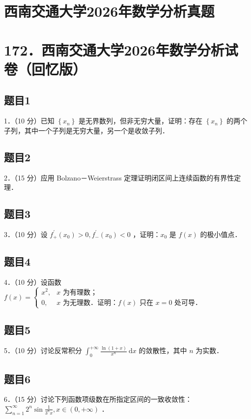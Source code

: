 \documentclass{article}
\begin{document}
\section*{西南交通大学2026年数学分析真题}
\section*{172．西南交通大学2026年数学分析试卷（回忆版）}

\subsection{题目1}
1．（10 分）已知 \(\left\{x_{n}\right\}\) 是无界数列，但非无穷大量，证明：存在 \(\left\{x_{n}\right\}\) 的两个子列，其中一个子列是无穷大量，另一个是收敛子列．

\subsection{题目2}
2．（15 分）应用 Bolzano－Weierstrass 定理证明闭区间上连续函数的有界性定理．

\subsection{题目3}
3．（10 分）设 \(f_{+}^{\prime}\left(x_{0}\right)>0, f_{-}^{\prime}\left(x_{0}\right)<0\) ，证明：\(x_{0}\) 是 \(f(x)\) 的极小值点．

\subsection{题目4}
4．（10 分）设函数 \(f(x)= \begin{cases}x^{2}, & x \text { 为有理数；} \\ 0, & x \text { 为无理数．证明：} f(x) \text { 只在 } x=0 \text { 处可导．}\end{cases}\)

\subsection{题目5}
5．（10 分）讨论反常积分 \(\int_{0}^{+\infty} \frac{\ln (1+x)}{x^{n}} \mathrm{~d} x\) 的敛散性，其中 \(n\) 为实数．

\subsection{题目6}
6．（15 分）讨论下列函数项级数在所指定区间的一致收敛性：\(\sum_{n=1}^{\infty} 2^{n} \sin \frac{1}{3^{n} x}, x \in(0,+\infty)\) ．
\end{document}
